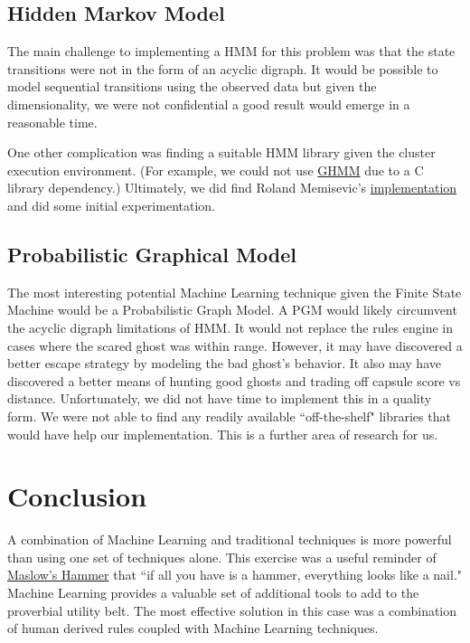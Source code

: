 \documentclass[11pt, oneside]{article}   	%
\begin{document}
\subsection{Hidden Markov Model}
The main challenge to implementing a HMM for this problem was that the state transitions were not in the form of an acyclic digraph. It would be possible to model sequential transitions using the observed data but given the dimensionality, we were not confidential a good result would emerge in a reasonable time.

One other complication was finding a suitable HMM library given the cluster execution environment. (For example, we could not use \href{www.ghmm.org}{GHMM} due to a C library dependency.) Ultimately, we did find Roland Memisevic's \href{http://www.iro.umontreal.ca/~memisevr/code/hmm.py}{implementation} and did some initial experimentation.

\subsection{Probabilistic Graphical Model}

The most interesting potential Machine Learning technique given the Finite State Machine would be a Probabilistic Graph Model.\cite{koller} A PGM would likely circumvent the acyclic digraph limitations of HMM. It would not replace the rules engine in cases where the scared ghost was within range. However, it may have discovered a better escape strategy by modeling the bad ghost's behavior. It also may have discovered a better means of hunting good ghosts and trading off capsule score vs distance. Unfortunately, we did not have time to implement this in a quality form. We were not able to find any readily available ``off-the-shelf" libraries that would have help our implementation. This is a further area of research for us.

\section{Conclusion}
A combination of Machine Learning and traditional techniques is more powerful than using one set of techniques alone. This exercise was a useful reminder of \href{http://en.wikipedia.org/wiki/Law_of_the_instrument}{Maslow's Hammer} that  ``if all you have is a hammer, everything looks like a nail." Machine Learning provides a valuable set of additional tools to add to the proverbial utility belt. The most effective solution in this case was a combination of human derived rules coupled with Machine Learning techniques. 
\end{document}
